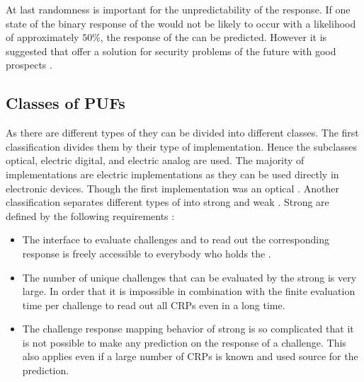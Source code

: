 At last randomness is important for the unpredictability of the \puf response.
If one state of the binary response of the \puf would not be likely to occur with a likelihood of approximately $50 \%$, the response of the \puf can be predicted.
However it is suggested that \pufs offer a solution for security problems of the future with good prospects \cite{Tajik2014PhysicalPUFs}.



\subsection{Classes of PUFs}
\label{sec:classesofpufs}

As there are different types of \pufs they can be divided into different classes.
The first classification divides them by their type of implementation.
Hence the subclasses optical, electric digital, and electric analog are used.
The majority of \puf implementations are electric implementations as they can be used directly in electronic devices.
Though the first \puf implementation was an optical \puf.
Another classification separates different types of \pufs into strong and weak \pufs.
Strong \pufs are defined by the following requirements \cite{Ruhrmair2013PUFsEvaluations}:

\begin{itemize}
\item The interface to evaluate challenges and to read out the corresponding response is freely accessible to everybody who holds the \puf.
\item The number of unique challenges that can be evaluated by the strong \puf is very large.
In order that it is impossible in combination with the finite evaluation time per challenge to read out all \acp{CRP} even in a long time.
\item The challenge response mapping behavior of strong \pufs is so complicated that it is not possible to make any prediction on the response of a challenge. 
This also applies even if a large number of \acp{CRP} is known and used source for the prediction.
\end{itemize}

